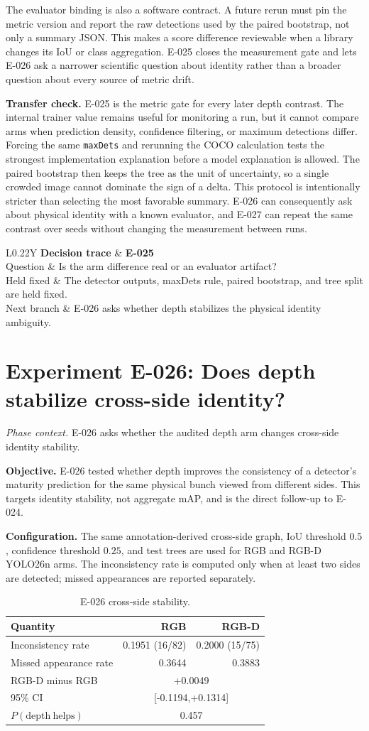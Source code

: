 \documentclass[preprint,12pt]{elsarticle}
\newcommand{\experiment}[2]{\par\medskip\Needspace{7\baselineskip}\section{Experiment #1: #2}}
\newcommand{\decisioncard}[4]{%
\begin{table}[H]\centering\small
\begin{tabularx}{\columnwidth}{L{0.22\columnwidth}Y}
\toprule
\textbf{Decision trace} & \textbf{#1}\\
Question & #2\\
Held fixed & #3\\
Next branch & #4\\
\bottomrule
\end{tabularx}
\end{table}}
\newcommand{\phasecontext}[1]{%
\par\smallskip\noindent\textit{Phase context.} #1\par\smallskip}
\begin{document}
The evaluator binding is also a software contract. A future rerun must pin the
metric version and report the raw detections used by the paired bootstrap, not
only a summary JSON. This makes a score difference reviewable when a library
changes its IoU or class aggregation. E-025 closes the measurement gate and
lets E-026 ask a narrower scientific question about identity rather than a
broader question about every source of metric drift.

\textbf{Transfer check.} E-025 is the metric gate for every later depth
contrast. The internal trainer value remains useful for monitoring a run, but
it cannot compare arms when prediction density, confidence filtering, or
maximum detections differ. Forcing the same \texttt{maxDets} and rerunning the
COCO calculation tests the strongest implementation explanation before a
model explanation is allowed. The paired bootstrap then keeps the tree as the
unit of uncertainty, so a single crowded image cannot dominate the sign of a
delta. This protocol is intentionally stricter than selecting the most
favorable summary. E-026 can consequently ask about physical identity with a
known evaluator, and E-027 can repeat the same contrast over seeds without
changing the measurement between runs.

\decisioncard{E-025}{Is the arm difference real or an evaluator artifact?}{The detector outputs, maxDets rule, paired bootstrap, and tree split are held fixed.}{E-026 asks whether depth stabilizes the physical identity ambiguity.}
\experiment{E-026}{Does depth stabilize cross-side identity?}
\phasecontext{E-026 asks whether the audited depth arm changes cross-side identity stability.}
\textbf{Objective.} E-026 tested whether depth improves the consistency of a
detector's maturity prediction for the same physical bunch viewed from
different sides. This targets identity stability, not aggregate mAP, and is
the direct follow-up to E-024.

\textbf{Configuration.} The same annotation-derived cross-side graph, IoU
threshold \(0.5\), confidence threshold \(0.25\), and test trees are used for
RGB and RGB-D YOLO26n arms. The inconsistency rate is computed only when at
least two sides are detected; missed appearances are reported separately.

\begin{table}[H]
\centering
\caption{E-026 cross-side stability.}
\label{tab:e026}
\begin{tabular}{lrr}
\toprule
Quantity & RGB & RGB-D\\
\midrule
Inconsistency rate & 0.1951 (16/82) & 0.2000 (15/75)\\
Missed appearance rate & 0.3644 & 0.3883\\
\midrule
RGB-D minus RGB & \multicolumn{2}{c}{+0.0049}\\
95\% CI & \multicolumn{2}{c}{[-0.1194,+0.1314]}\\
\(P(\mathrm{depth\ helps})\) & \multicolumn{2}{c}{0.457}\\
\bottomrule
\end{tabular}
\end{table}
\end{document}
